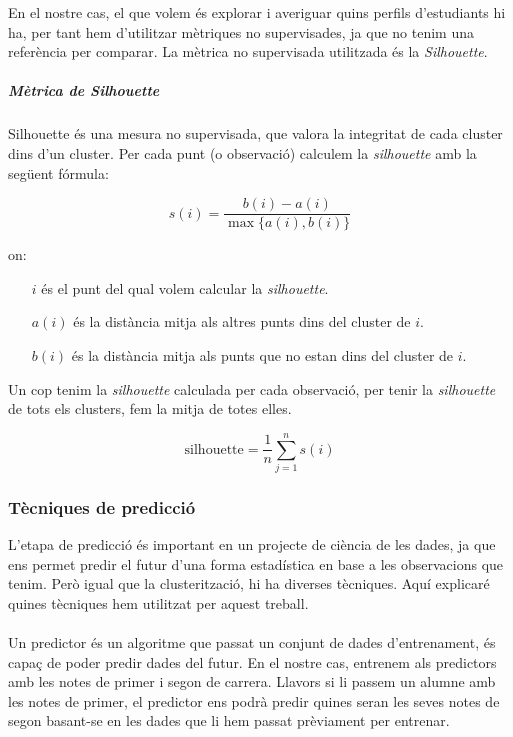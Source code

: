 \documentclass[12pt,a4paper,catalan]{article}
\begin{document}
En el nostre cas, el que volem és explorar i averiguar quins perfils d'estudiants hi ha, per tant hem d'utilitzar mètriques no supervisades, ja que no tenim una referència per comparar. La mètrica no supervisada utilitzada és la \textit{Silhouette}.

\subparagraph{\textit{Mètrica de Silhouette}}
Silhouette \cite{silhouette} és una mesura no supervisada, que valora la integritat de cada cluster dins d'un cluster. Per cada punt (o observació) calculem la \textit{silhouette} amb la següent fórmula:

$$ s(i) = \frac{b(i) - a(i)}{\max\{a(i),b(i)\}} $$

on:
\begin{itemize}[leftmargin=.5in]
	\item [$i$] és el punt del qual volem calcular la \textit{silhouette}.
	\item [$a(i)$] és la distància mitja als altres punts dins del cluster de $i$.
	\item [$b(i)$] és la distància mitja als punts que no estan dins del cluster de $i$.
\end{itemize}

Un cop tenim la \textit{silhouette} calculada per cada observació, per tenir la \textit{silhouette} de tots els clusters, fem la mitja de totes elles.

$$ \mathrm{silhouette} = \frac{1}{n} \sum_{j=1}^n s(i) $$

\newpage


\subsubsection{Tècniques de predicció}
\label{subsec:predictors}
L'etapa de predicció és important en un projecte de ciència de les dades, ja que ens permet predir el futur d'una forma estadística en base a les observacions que tenim. Però igual que la clusterització, hi ha diverses tècniques. Aquí explicaré quines tècniques hem utilitzat per aquest treball.
\\
\\
Un predictor és un algoritme que passat un conjunt de dades d'entrenament, és capaç de poder predir dades del futur. En el nostre cas, entrenem als predictors amb les notes de primer i segon de carrera. Llavors si li passem un alumne amb les notes de primer, el predictor ens podrà predir quines seran les seves notes de segon basant-se en les dades que li hem passat prèviament per entrenar.
\end{document}
